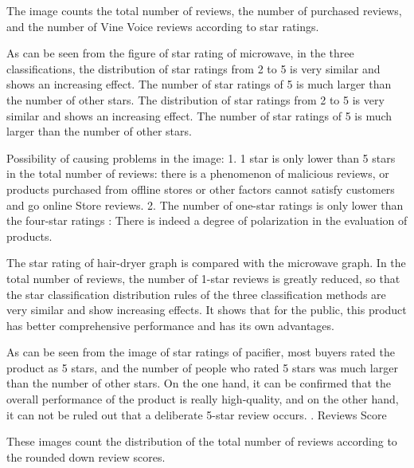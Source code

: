 \documentclass[12pt]{article}
\begin{document}
The image counts the total number of reviews, the number of purchased reviews, and the number of Vine Voice reviews according to star ratings.\par
As can be seen from the figure of star rating of microwave, in the three classifications, the distribution of star ratings from 2 to 5 is very similar and shows an increasing effect. The number of star ratings of 5 is much larger than the number of other stars. The distribution of star ratings from 2 to 5 is very similar and shows an increasing effect. The number of star ratings of 5 is much larger than the number of other stars.
\par
Possibility of causing problems in the image: 1. 1 star is only lower than 5 stars in the total number of reviews: there is a phenomenon of malicious reviews, or products purchased from offline stores or other factors cannot satisfy customers and go online Store reviews. 2. The number of one-star ratings is only lower than the four-star ratings : There is indeed a degree of polarization in the evaluation of products.
\par
The star rating of hair-dryer graph is compared with the microwave graph. In the total number of reviews, the number of 1-star reviews is greatly reduced, so that the star classification distribution rules of the three classification methods are very similar and show increasing effects. It shows that for the public, this product has better comprehensive performance and has its own advantages.
\par
As can be seen from the image of star ratings of pacifier, most buyers rated the product as 5 stars, and the number of people who rated 5 stars was much larger than the number of other stars. On the one hand, it can be confirmed that the overall performance of the product is really high-quality, and on the other hand, it can not be ruled out that a deliberate 5-star review occurs.
. Reviews Score
\par
\quad\par\quad\par\quad\par\quad\par\quad\par\quad\par\quad\par\quad\par\quad\par\quad\par
These images count the distribution of the total number of reviews according to the rounded down review scores.
\end{document}
